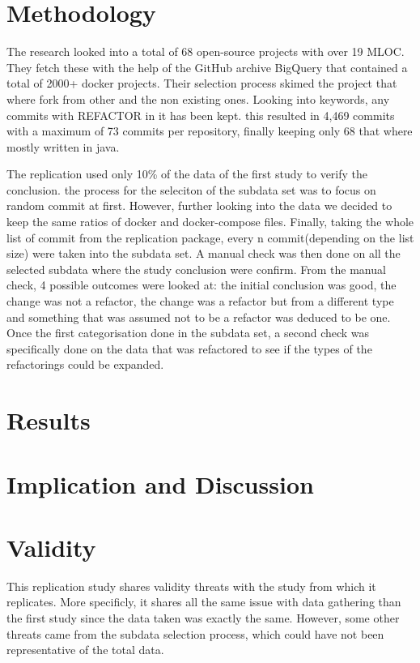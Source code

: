 \documentclass[lettersize,journal]{IEEEtran}
\begin{document}
\section{Methodology}

The research looked into a total of 68 open-source projects with over 19 MLOC. 
They fetch these with the help of the GitHub archive BigQuery that contained a total of 2000+ docker projects.
Their selection process skimed the project that where fork from other and the non existing ones.
Looking into keywords, any commits with REFACTOR in it has been kept.
this resulted in 4,469 commits with a maximum of 73 commits per repository, finally keeping only 68 that where mostly written in java.


The replication used only 10\% of the data of the first study to verify the conclusion.
the process for the seleciton of the subdata set was to focus on random commit at first. 
However, further looking into the data we decided to keep the same ratios of docker and docker-compose files.
Finally, taking the whole list of commit from the replication package, every n commit(depending on the list size) were taken into the subdata set.
A manual check was then done on all the selected subdata where the study conclusion were confirm.
From the manual check, 4 possible outcomes were looked at: the initial conclusion was good, the change was not a refactor, the change was a refactor but from a different type and something that was assumed not to be a refactor was deduced to be one.  
Once the first categorisation done in the subdata set, a second check was specifically done on the data that was refactored to see if the types of the refactorings could be expanded.

\section{Results}

\section{Implication and Discussion}

\section{Validity}

This replication study shares validity threats with the study from \cite{1} which it replicates.
More specificly, it shares all the same issue with data gathering than the first study since the data taken was exactly the same.
However, some other threats came from the subdata selection process, which could have not been representative of the total data.
\end{document}
